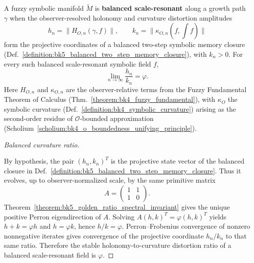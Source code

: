 \begin{theorem}
\label{theorem:bk5_golden_ratio_curvature_scalar}
A fuzzy symbolic manifold $\tilde{M}$ is \textbf{balanced scale-resonant} along
a growth path $\gamma$ when the observer-resolved holonomy and curvature
distortion amplitudes
\[
h_n=\|H_{O,n}(\gamma,f)\|,\qquad
k_n=\|\kappa_{O,n}(f,\int f)\|
\]
form the projective coordinates of a balanced two-step symbolic memory closure
(Def.~\ref{definition:bk5_balanced_two_step_memory_closure}), with $k_n>0$.
For every such balanced scale-resonant symbolic field $f$,
\[
\lim_{n\to\infty}\frac{h_n}{k_n}=\varphi.
\]
Here $H_{O,n}$ and $\kappa_{O,n}$ are the observer-relative terms from the Fuzzy
Fundamental Theorem of Calculus (Thm.~\ref{theorem:bk4_fuzzy_fundamental}), with
$\kappa_O$ the symbolic curvature (Def.~\ref{definition:bk4_symbolic_curvature})
arising as the second-order residue of $\mathcal{O}$-bounded approximation
(Scholium~\ref{scholium:bk4_o_boundedness_unifying_principle}).
\end{theorem}

\begin{proof}[Balanced curvature ratio]
\label{proof:bk5_golden_ratio_curvature_scalar}
\leavevmode

By hypothesis, the pair $(h_n,k_n)^T$ is the projective state vector of the
balanced closure in Def.~\ref{definition:bk5_balanced_two_step_memory_closure}.
Thus it evolves, up to observer-normalized scale, by the same primitive matrix
\[
A=\begin{pmatrix}1&1\\1&0\end{pmatrix}.
\]
Theorem~\ref{theorem:bk5_golden_ratio_spectral_invariant} gives the unique
positive Perron eigendirection of $A$.  Solving
$A(h,k)^T=\varphi(h,k)^T$ yields $h+k=\varphi h$ and
$h=\varphi k$, hence $h/k=\varphi$.  Perron--Frobenius convergence of
nonzero nonnegative iterates gives convergence of the projective coordinate
$h_n/k_n$ to that same ratio.  Therefore the stable holonomy-to-curvature
distortion ratio of a balanced scale-resonant field is $\varphi$.
\end{proof}

